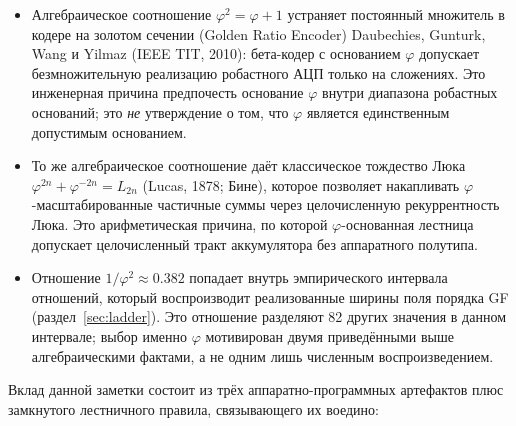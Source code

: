 \documentclass[11pt,a4paper]{article}
\theoremstyle{plain}
\begin{document}
\begin{itemize}\setlength{\itemsep}{2pt}
\item Алгебраическое соотношение \(\varphi^{2} = \varphi + 1\) устраняет
постоянный множитель в кодере на золотом сечении (Golden Ratio Encoder)
Daubechies, Gunturk, Wang и Yilmaz (IEEE TIT, 2010): бета-кодер с основанием
\(\varphi\) допускает безмножительную реализацию робастного АЦП только на
сложениях. Это инженерная причина предпочесть основание \(\varphi\) внутри
диапазона робастных оснований; это \emph{не} утверждение о том, что \(\varphi\)
является единственным допустимым основанием.
\item То же алгебраическое соотношение даёт классическое тождество Люка
\(\varphi^{2n} + \varphi^{-2n} = L_{2n}\) (Lucas, 1878; Бине),
которое позволяет накапливать \(\varphi\)-масштабированные частичные суммы через
целочисленную рекуррентность Люка. Это арифметическая причина, по которой
\(\varphi\)-основанная лестница допускает целочисленный тракт аккумулятора без
аппаратного полутипа.
\item Отношение \(1/\varphi^{2} \approx 0.382\) попадает внутрь эмпирического
интервала отношений, который воспроизводит реализованные ширины поля порядка GF
(раздел~\ref{sec:ladder}). Это отношение разделяют 82 других значения в данном
интервале; выбор именно \(\varphi\) мотивирован двумя приведёнными выше
алгебраическими фактами, а не одним лишь численным воспроизведением.
\end{itemize}

Вклад данной заметки состоит из трёх аппаратно-программных артефактов плюс
замкнутого лестничного правила, связывающего их воедино:
\end{document}
